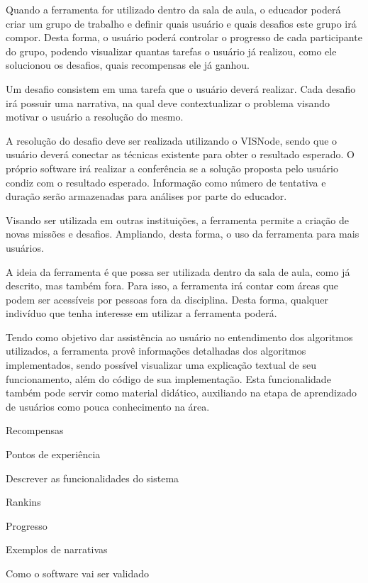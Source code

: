 \documentclass[
	12pt,				%
	oneside,			%
	a4paper,			%
	english,			%
	french,				%
	spanish,			%
	brazil,				%
	]{abntex2}
\begin{document}
Quando a ferramenta for utilizado dentro da sala de aula, o educador poderá criar um grupo de trabalho e definir quais usuário e quais desafios este grupo irá compor. Desta forma, o usuário poderá controlar o progresso de cada participante do grupo, podendo visualizar quantas tarefas o usuário já realizou, como ele solucionou os desafios, quais recompensas ele já ganhou.

Um desafio consistem em uma tarefa que o usuário deverá realizar. Cada desafio irá possuir uma narrativa, na qual deve contextualizar o problema visando motivar o usuário a resolução do mesmo.

A resolução do desafio deve ser realizada utilizando o VISNode, sendo que o usuário deverá conectar as técnicas existente para obter o resultado esperado. O próprio software irá realizar a conferência se a solução proposta pelo usuário condiz com o resultado esperado. Informação como número de tentativa e duração serão armazenadas para análises por parte do educador.

Visando ser utilizada em outras instituições, a ferramenta permite a criação de novas missões e desafios. Ampliando, desta forma, o uso da ferramenta para mais usuários.

A ideia da ferramenta é que possa ser utilizada dentro da sala de aula, como já descrito, mas também fora. Para isso, a ferramenta irá contar com áreas que podem ser acessíveis por pessoas fora da disciplina. Desta forma, qualquer indivíduo que tenha interesse em utilizar a ferramenta poderá.

Tendo como objetivo dar assistência ao usuário no entendimento dos algoritmos utilizados, a ferramenta provê informações detalhadas dos algoritmos implementados, sendo possível visualizar uma explicação textual de seu funcionamento, além do código de sua implementação. Esta funcionalidade também pode servir como material didático, auxiliando na etapa de aprendizado de usuários como pouca conhecimento na área.

Recompensas

Pontos de experiência

Descrever as funcionalidades do sistema

Rankins

Progresso

Exemplos de narrativas

Como o software vai ser validado

\end{document}
